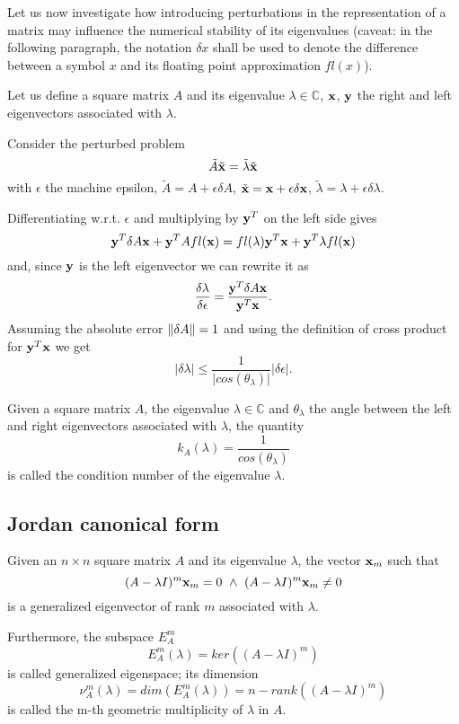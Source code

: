 Let us now investigate how introducing perturbations in the representation of a matrix may influence the numerical stability of its
eigenvalues (caveat: in the following paragraph, the notation \(\delta x\) shall be used to denote the difference between a symbol
\(x\) and its floating point approximation \(fl(x)\)).

Let us define a square matrix \(A\) and its eigenvalue \(\lambda \in \mathbb{C}\), \(\vb{x}\), \(\vb{y}\) the right
and left eigenvectors associated with \(\lambda\).

Consider the perturbed problem
\[
    \tilde{A} \tilde{\vb{x}} = \tilde{\lambda} \tilde{\vb{x}}
\]
with \(\epsilon\) the machine epsilon, \(\tilde{A} = A + \epsilon\delta A\), \(\tilde{\vb{x}} = \vb{x} +
\epsilon\delta \vb{x}\), \(\tilde{\lambda} = \lambda + \epsilon\delta \lambda\).

Differentiating w.r.t. \(\epsilon\) and multiplying by \(\vb{y}^T\) on the left side gives
\[
    \vb{y}^T \delta A \vb{x} + \vb{y}^T A fl(\vb{x}) = fl(\lambda) \vb{y}^T \vb{x} + \vb{y}^T \lambda fl(\vb{x})
\]
and, since \(\vb{y}\) is the left eigenvector we can rewrite it as
\[
    \dfrac{\delta \lambda}{\delta \epsilon} = \dfrac{\vb{y}^T \delta A \vb{x}}{\vb{y}^T \vb{x}}.
\]
Assuming the absolute error \(\norm{\delta A} = 1\) and using the definition of cross product for \(\vb{y}^T \vb{x}\) we get
\[
    \vert \delta \lambda \vert \leq \dfrac{1}{\vert cos(\theta_{\lambda}) \vert} \vert \delta \epsilon \vert.
\]

\begin{definition}
    Given a square matrix \(A\), the eigenvalue \(\lambda \in \mathbb{C}\) and \(\theta_{\lambda}\) the angle between the left
    and right eigenvectors associated with \(\lambda\), the quantity
    \[k_{A}(\lambda) = \dfrac{1}{cos(\theta_{\lambda})}\]
    is called the condition number of the eigenvalue \(\lambda\).
\end{definition}
    
\subsection*{Jordan canonical form}
\begin{definition}
    Given an \(n \times n\) square matrix \(A\) and its eigenvalue \(\lambda\), the vector \(\vb{x}_{m}\) such that
    \[
        (A - \lambda I)^{m} \vb{x}_{m} = 0 \ \wedge \ (A - \lambda I)^{m} \vb{x}_{m} \neq 0
    \]
    is a generalized eigenvector of rank \(m\) associated with \(\lambda\).

    Furthermore, the subspace \(E_{A}^m\)
    \[
        E_{A}^m(\lambda) = ker((A - \lambda I)^m)
    \]
    is called generalized eigenspace;
    its dimension
    \[
        \nu_{A}^{m}(\lambda) = dim(E_{A}^{m}(\lambda)) = n - rank((A - \lambda I)^m)
    \]
    is called the m-th geometric multiplicity of \(\lambda\) in \(A\).
\end{definition}

